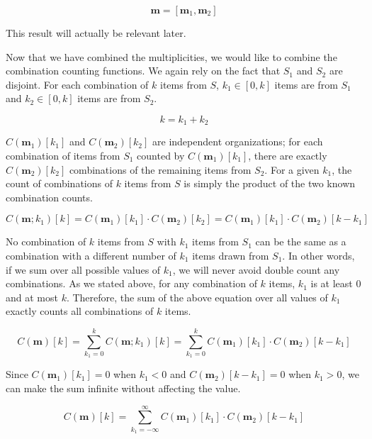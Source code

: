 \documentclass{article}
\begin{document}
\begin{equation}
    \bm{m} = [\bm{m}_1, \bm{m}_2]
\end{equation}

This result will actually be relevant later. 

Now that we have combined the multiplicities, we would like to combine the combination counting functions. We again rely on the fact that $S_1$ and $S_2$ are disjoint. For each combination of $k$ items from $S$, $k_1 \in [0, k]$ items are from $S_1$ and $k_2\in [0, k]$ items are from $S_2$. 

\begin{equation}
    k = k_1 + k_2
\end{equation}

$C(\bm{m}_1)[k_1]$ and $C(\bm{m}_2)[k_2]$ are independent organizations; for each combination of items from $S_1$ counted by $C(\bm{m}_1)[k_1]$, there are exactly $C(\bm{m}_2)[k_2]$ combinations of the remaining items from $S_2$. For a given $k_1$, the count of combinations of $k$ items from $S$ is simply the product of the two known combination counts.

\begin{equation}
    C(\bm{m}; k_1)[k] = C(\bm{m}_1)[k_1] \cdot C(\bm{m}_2)[k_2] = C(\bm{m}_1)[k_1] \cdot C(\bm{m}_2)[k - k_1]
\end{equation}

No combination of $k$ items from $S$ with $k_1$ items from $S_1$ can be the same as a combination with a different number of $k_1$ items drawn from $S_1$. In other words, if we sum over all possible values of $k_1$, we will never avoid double count any combinations. As we stated above, for any combination of $k$ items, $k_1$ is at least $0$ and at most $k$. Therefore, the sum of the above equation over all values of $k_1$ exactly counts all combinations of $k$ items.

\begin{equation}
    C(\bm{m})[k] = \sum_{k_1 = 0}^{k} C(\bm{m}; k_1)[k] = \sum_{k_1 = 0}^{k} C(\bm{m}_1)[k_1] \cdot C(\bm{m}_2)[k - k_1]
\end{equation}

Since $C(\bm{m}_1)[k_1] = 0$ when $k_1 < 0$ and $C(\bm{m}_2)[k - k_1] = 0$ when $k_1 > 0$, we can make the sum infinite without affecting the value.

\begin{equation}
    C(\bm{m})[k] = \sum_{k_1 = -\infty}^{\infty} C(\bm{m}_1)[k_1] \cdot C(\bm{m}_2)[k - k_1]
\end{equation}
\end{document}
